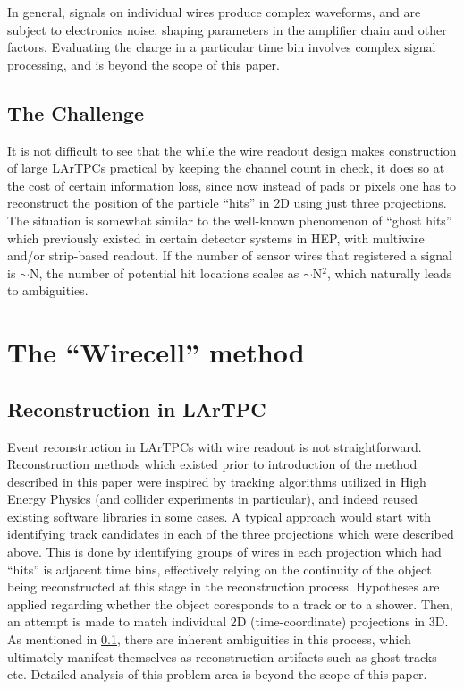 \documentclass[a4paper]{jpconf}
\begin{document}
In general, signals on individual wires produce complex waveforms, and are subject to electronics noise, shaping parameters in the
amplifier chain and other factors. Evaluating the charge in a particular time bin involves complex signal processing, and
is beyond the scope of this paper.

\subsection{The Challenge}
\label{ambiguity}
It is not difficult to see that the while the wire readout design makes construction of large LArTPCs practical by keeping the channel count
in check, it does so at the cost of certain information loss, since now instead of pads or pixels one has to reconstruct the position of the
particle ``hits'' in 2D using just three projections. The situation is somewhat similar to the well-known phenomenon of ``ghost hits'' which
previously existed in certain detector systems in HEP, with multiwire and/or strip-based readout. If the number of sensor wires that
registered a signal is $\sim$N, the number of potential hit locations scales as $\sim$N$^2$, which naturally leads to ambiguities.



\section{The ``Wirecell'' method}
\subsection{Reconstruction in LArTPC}
Event reconstruction in LArTPCs with wire readout is not straightforward.
Reconstruction methods which existed prior to introduction of the method described in this paper were inspired by tracking
algorithms utilized in High Energy Physics (and collider experiments in particular), and indeed reused existing software libraries
in some cases. A typical approach would start with identifying track candidates in each of the three projections which were described
above. This is done by identifying groups of wires in each projection which had ``hits'' is adjacent time bins, effectively relying
on the continuity of the object being reconstructed at this stage in the reconstruction process. Hypotheses are applied regarding
whether the object coresponds to a track or to a shower. Then, an attempt is made to match individual 2D (time-coordinate)
projections in 3D. As mentioned in \ref{ambiguity}, there are inherent ambiguities in this process, which ultimately manifest themselves as
reconstruction artifacts such as ghost tracks etc. Detailed analysis of this problem area is beyond the scope of this paper.
\end{document}
